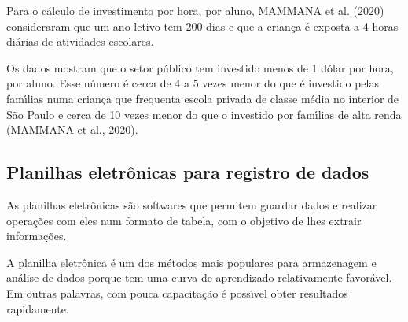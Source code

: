 \documentclass[
12pt,		%
openright,	%
twoside,  %
a4paper,			%
chapter=TITLE,		%
english,			%
french,				%
spanish,			%
brazil				%
]{USPSC-classe/USPSC}
\begin{document}
Para o c\'alculo de investimento por hora, por aluno,  MAMMANA et al. (2020) consideraram que um ano letivo tem 200 dias e que a crian\c{c}a \'e exposta a 4 horas di\'arias de atividades escolares.









Os dados mostram que o setor p\'ublico tem investido menos de 1 d\'olar por hora, por aluno. Esse n\'umero \'e cerca de 4 a 5 vezes menor do que \'e investido pelas fam\'{\i}lias numa crian\c{c}a que frequenta escola privada de classe m\'edia no interior de S\~ao Paulo e cerca de 10 vezes menor do que o investido por fam\'{\i}lias de alta renda  (MAMMANA et al., 2020).










\noindent\begin{center}\mbox{\centering{}}\end{center}


\subsection[Planilhas eletr\^onicas para registro de dados]{Planilhas eletr\^onicas para registro de dados}\label{Planilhas eletr\^onicas para registro de dados}
As planilhas eletr\^onicas s\~ao softwares que permitem guardar  dados e realizar opera\c{c}\~oes com eles num formato de tabela, com o objetivo de lhes extrair informa\c{c}\~oes.









A planilha eletr\^onica \'e um dos m\'etodos mais populares para armazenagem e an\'alise de dados porque tem uma curva de aprendizado relativamente favor\'avel. Em outras palavras, com pouca capacita\c{c}\~ao \'e poss\'{\i}vel obter resultados rapidamente.
\end{document}
